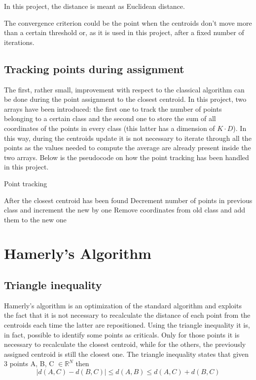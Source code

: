 \documentclass[conference]{IEEEtran}
\begin{document}
In this project, the distance is meant as Euclidean distance.

The convergence criterion could be the point when the centroids don't move more than a certain threshold or, as it is used in this project, after a fixed number of iterations.

\subsection{Tracking points during assignment}
The first, rather small, improvement with respect to the classical algorithm can be done during the point assignment to the closest centroid. In this project, two arrays have been introduced: the first one to track the number of points belonging to a certain class and the second one to store the sum of all coordinates of the points in every class (this latter has a dimension of $K \cdot D$). In this way, during the centroids update it is not necessary to iterate through all the points as the values needed to compute the average are already present inside the two arrays. Below is the pseudocode on how the point tracking has been handled in this project.

\begin{algorithm}[H]
    \caption{Point tracking}
    \begin{algorithmic}
      \State After the closest centroid has been found
        \State Decrement number of points in previous class and increment the new by one
        \State Remove coordinates from old class and add them to the new one
      \EndIf
    \end{algorithmic}
  \end{algorithm}
  
\section{Hamerly's Algorithm}
\subsection{Triangle inequality}
Hamerly's algorithm\cite{b1} is an optimization of the standard algorithm and exploits the fact that it is not necessary to recalculate the distance of each point from the centroids each time the latter are repositioned. Using the triangle inequality it is, in fact, possible to identify some points as criticals. Only for those points it is necessary to recalculate the closest centroid, while for the others, the previously assigned centroid is still the closest one.
The triangle inequality states that given 3 points A, B, C $\in \mathbb{R}^N$ then  
\begin{equation}
    \label{eq:triineq}
    |d(A, C) - d(B, C)| \leq d(A, B) \leq d(A, C) + d(B, C)
\end{equation}
    
\end{document}
